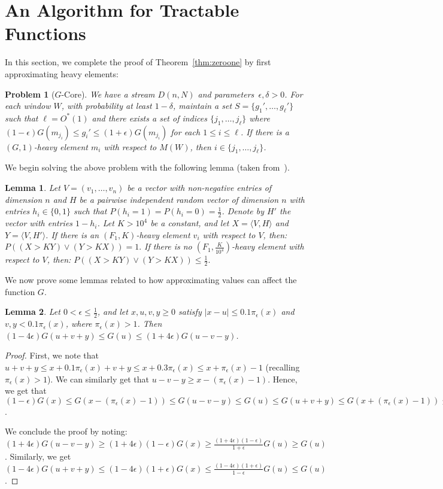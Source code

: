 \documentclass[11pt]{article}
\newtheorem{lem}{Lemma}
\newtheorem{prob}{Problem}
\begin{document}
\section{An Algorithm for Tractable Functions}\label{sec:tract}
In this section, we complete the proof of Theorem~\ref{thm:zeroone} by first approximating heavy elements:
\begin{prob}[$G$-Core]\label{prob:heavy}
We have a stream $D(n,N)$ and parameters~$\epsilon,\delta > 0$.  For each window $W$, with probability at least $1-\delta$,
maintain a set $S = \{g_1',\ldots,g_\ell'\}$ such that
$\ell = O^*(1)$ and there exists a set of indices $\{j_1,\ldots,j_{\ell}\}$ where $(1-\epsilon)G(m_{j_i}) \leq g_i' \leq (1+\epsilon)G(m_{j_i})$
for each $1 \leq i \leq \ell$.  If there is a $(G,1)$-heavy element $m_i$ with respect to $M(W)$, then $i \in \{j_1,\ldots,j_{\ell}\}$.
\end{prob}

We begin solving the above problem with the following lemma (taken from~\cite{BO10}).

\begin{lem}\label{lem:majorseparation}
Let $V = (v_1,\ldots,v_n)$ be a vector with non-negative entries of dimension $n$ and $H$ be a pairwise independent random vector
of dimension $n$ with entries $h_i \in \{0,1\}$ such that $P(h_i = 1) = P(h_i = 0) = \frac{1}{2}$.   Denote
by $H'$ the vector with entries $1 - h_i$.  Let $K > 10^4$ be a constant, and let $X = \langle V,H \rangle$
and $Y = \langle V,H' \rangle$.
If there is an $(F_1,K)$-heavy element $v_i$ with respect to $V$, then:
$P((X > KY) \vee (Y > KX)) = 1.$
If there is no $(F_1,\frac{K}{10^4})$-heavy element with respect to $V$, then:
$P((X > KY) \vee (Y > KX)) \leq \frac{1}{2}.$
\end{lem}

We now prove some lemmas related to how approximating values can affect the function $G$.

\begin{lem}\label{lem:Gapprox}
Let $0 < \epsilon \leq \frac{1}{2}$, and let $x,u,v,y \geq 0$ satisfy $|x - u| \leq 0.1\pi_\epsilon(x)$ and
$v,y < 0.1 \pi_\epsilon(x)$, where $\pi_\epsilon(x) > 1$.
Then $(1 - 4\epsilon)G(u+v+y) \leq G(u) \leq (1+4\epsilon)G(u-v-y)$.
\end{lem}
\begin{proof}
First, we note that $u+v+y \leq x + 0.1 \pi_\epsilon(x) + v + y \leq
x + 0.3 \pi_\epsilon(x) \leq x + \pi_\epsilon(x) - 1$ (recalling $\pi_\epsilon(x) > 1$).  We can
similarly get that $u-v-y \geq x - (\pi_\epsilon(x) - 1)$.
Hence, we get that $(1-\epsilon)G(x) \leq G(x - (\pi_\epsilon(x) - 1)) \leq G(u-v-y) \leq G(u) \leq G(u+v+y)
\leq G(x + (\pi_\epsilon(x) - 1)) \leq (1+\epsilon)G(x)$.

We conclude the proof by noting: $(1+4\epsilon)G(u-v-y) \geq (1+4\epsilon)(1-\epsilon)G(x)
\geq \frac{(1+4\epsilon)(1-\epsilon)}{1+\epsilon}G(u) \geq G(u)$.  Similarly, we get
$(1-4\epsilon)G(u+v+y) \leq (1-4\epsilon)(1+\epsilon)G(x) \leq \frac{(1-4\epsilon)(1+\epsilon)}{1-\epsilon}G(u)
\leq G(u)$.
\end{proof}
\end{document}

